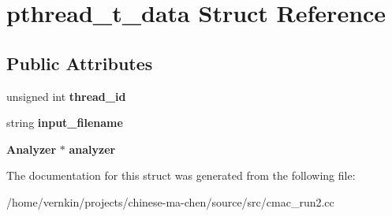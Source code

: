 \section{pthread\_\-t\_\-data Struct Reference}
\label{structpthread__t__data}
\subsection*{Public Attributes}
\begin{DoxyCompactItemize}
\item 
unsigned int {\bfseries thread\_\-id}\label{structpthread__t__data_a78e4980416277650757820054ee211ba}

\item 
string {\bfseries input\_\-filename}\label{structpthread__t__data_ad8c235058f70652b92ec236a9ad44b61}

\item 
{\bf Analyzer} $\ast$ {\bfseries analyzer}\label{structpthread__t__data_a847f563beb02c98e40e5ebb14b750488}

\end{DoxyCompactItemize}


The documentation for this struct was generated from the following file:\begin{DoxyCompactItemize}
\item 
/home/vernkin/projects/chinese-\/ma-\/chen/source/src/cmac\_\-run2.cc\end{DoxyCompactItemize}
